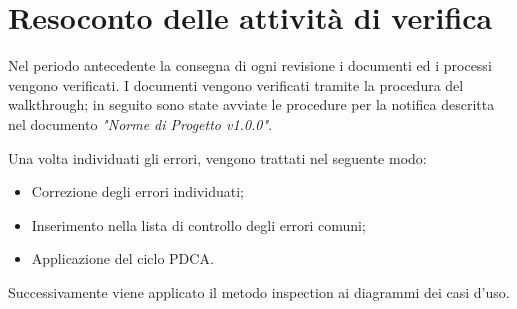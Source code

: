 \documentclass[12pt,a4paper,titlepage]{article}
\begin{document}
	\section{Resoconto delle attività di verifica}
	Nel periodo antecedente la consegna di ogni revisione i documenti ed i processi vengono verificati. I documenti vengono verificati tramite la procedura del walkthrough; in seguito sono state avviate le procedure per la notifica descritta nel documento \textit{"Norme di Progetto v1.0.0"}. 
	
	Una volta individuati gli errori, vengono trattati nel seguente modo:
	\begin{itemize}
		\item Correzione degli errori individuati;
		\item Inserimento nella lista di controllo degli errori comuni;
		\item Applicazione del ciclo PDCA.
	\end{itemize}
	Successivamente viene applicato il metodo inspection ai diagrammi dei casi d'uso.
\end{document}

